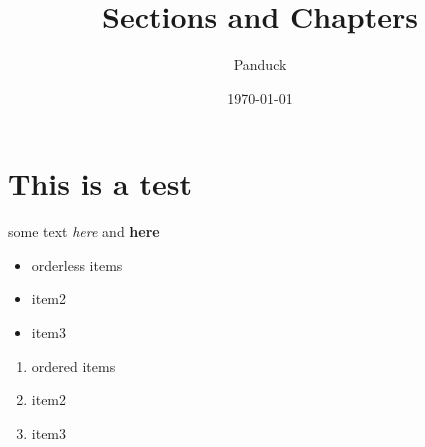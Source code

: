 \documentclass{article}
\title{Sections and Chapters}
\author{Panduck}
\date{\today}
\begin{document}
\section{This is a test}
\label{sec:this-is-a-test}

some text \emph{here} and \textbf{here}

\begin{itemize}
    \item orderless items
    \item item2
    \item item3
\end{itemize}

\begin{enumerate}
    \item ordered items
    \item item2
    \item item3
\end{enumerate}
\end{document}
